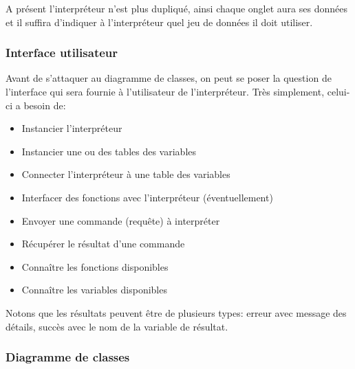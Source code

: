 \documentclass[french]{article}
\begin{document}
			A présent l'interpréteur n'est plus dupliqué, ainsi chaque onglet aura ses données et il suffira d'indiquer à l'interpréteur quel jeu de données il doit utiliser.
			
			\subsubsection{Interface utilisateur}
				Avant de s'attaquer au diagramme de classes, on peut se poser la question de l'interface qui sera fournie à l'utilisateur de l'interpréteur. Très simplement, celui-ci a besoin de:
				
				\begin{itemize}
					\item Instancier l'interpréteur
					\item Instancier une ou des tables des variables
					\item Connecter l'interpréteur à une table des variables
					\item Interfacer des fonctions avec l'interpréteur (éventuellement)
					\item Envoyer une commande (requête) à interpréter
					\item Récupérer le résultat d'une commande
					\item Connaître les fonctions disponibles
					\item Connaître les variables disponibles
				\end{itemize}
				
				Notons que les résultats peuvent être de plusieurs types: erreur avec message des détails, succès avec le nom de la variable de résultat.
			
			\subsubsection{Diagramme de classes}
			
\end{document}

